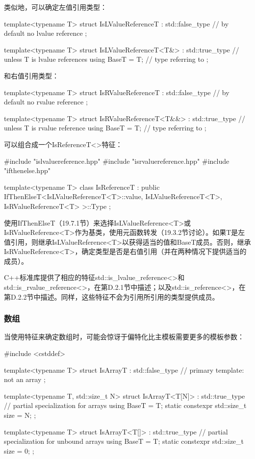 类似地，可以确定左值引用类型：

\begin{cpp}
template<typename T>
struct IsLValueReferenceT : std::false_type { // by default no lvalue reference
};

template<typename T>
struct IsLValueReferenceT<T&> : std::true_type { // unless T is lvalue references
	using BaseT = T; // type referring to
};
\end{cpp}

和右值引用类型：

\begin{cpp}
template<typename T>
struct IsRValueReferenceT : std::false_type { // by default no rvalue reference
};

template<typename T>
struct IsRValueReferenceT<T&&> : std::true_type { // unless T is rvalue reference
	using BaseT = T; // type referring to
};
\end{cpp}

可以组合成一个IsReferenceT<>特征：

\begin{cpp}
#include "islvaluereference.hpp"
#include "isrvaluereference.hpp"
#include "ifthenelse.hpp"

template<typename T>
class IsReferenceT
	: public IfThenElseT<IsLValueReferenceT<T>::value,
						IsLValueReferenceT<T>,
						IsRValueReferenceT<T>
	>::Type {
};
\end{cpp}

使用IfThenElseT（19.7.1节）来选择IsLValueReference<T>或IsRValueReference<T>作为基类，使用元函数转发（19.3.2节讨论）。如果T是左值引用，则继承IsLValueReference<T>以获得适当的值和BaseT成员。否则，继承IsRValueReference<T>，确定类型是否是右值引用（并在两种情况下提供适当的成员）。

C++标准库提供了相应的特征std::is\_lvalue\_reference<>和std::is\_rvalue\_reference<>，在第D.2.1节中描述；以及std::is\_reference<>，在第D.2.2节中描述。同样，这些特征不会为引用所引用的类型提供成员。

\subsubsection{数组}

当使用特征来确定数组时，可能会惊讶于偏特化比主模板需要更多的模板参数：

\begin{cpp}
#include <cstddef>

template<typename T>
struct IsArrayT : std::false_type { // primary template: not an array
};

template<typename T, std::size_t N>
struct IsArrayT<T[N]> : std::true_type { // partial specialization for arrays
	using BaseT = T;
	static constexpr std::size_t size = N;
};

template<typename T>
struct IsArrayT<T[]> : std::true_type { // partial specialization for unbound arrays
	using BaseT = T;
	static constexpr std::size_t size = 0;
};
\end{cpp}

